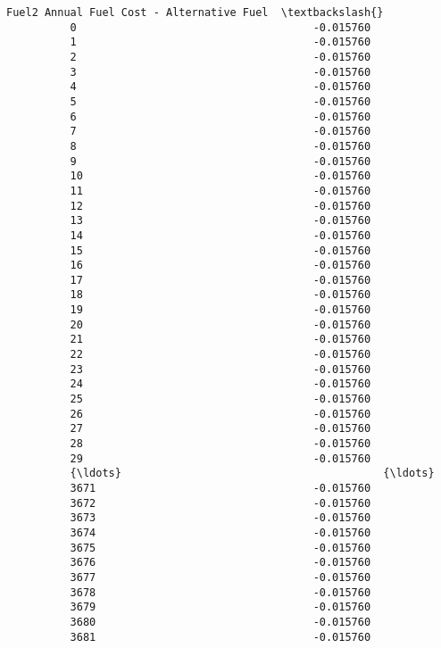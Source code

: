 \documentclass[11pt]{article}
\begin{document}
\begin{Verbatim}[commandchars=\\\{\}]
                Fuel2 Annual Fuel Cost - Alternative Fuel  \textbackslash{}
          0                                     -0.015760   
          1                                     -0.015760   
          2                                     -0.015760   
          3                                     -0.015760   
          4                                     -0.015760   
          5                                     -0.015760   
          6                                     -0.015760   
          7                                     -0.015760   
          8                                     -0.015760   
          9                                     -0.015760   
          10                                    -0.015760   
          11                                    -0.015760   
          12                                    -0.015760   
          13                                    -0.015760   
          14                                    -0.015760   
          15                                    -0.015760   
          16                                    -0.015760   
          17                                    -0.015760   
          18                                    -0.015760   
          19                                    -0.015760   
          20                                    -0.015760   
          21                                    -0.015760   
          22                                    -0.015760   
          23                                    -0.015760   
          24                                    -0.015760   
          25                                    -0.015760   
          26                                    -0.015760   
          27                                    -0.015760   
          28                                    -0.015760   
          29                                    -0.015760   
          {\ldots}                                         {\ldots}   
          3671                                  -0.015760   
          3672                                  -0.015760   
          3673                                  -0.015760   
          3674                                  -0.015760   
          3675                                  -0.015760   
          3676                                  -0.015760   
          3677                                  -0.015760   
          3678                                  -0.015760   
          3679                                  -0.015760   
          3680                                  -0.015760   
          3681                                  -0.015760   

\end{Verbatim}
\end{document}
